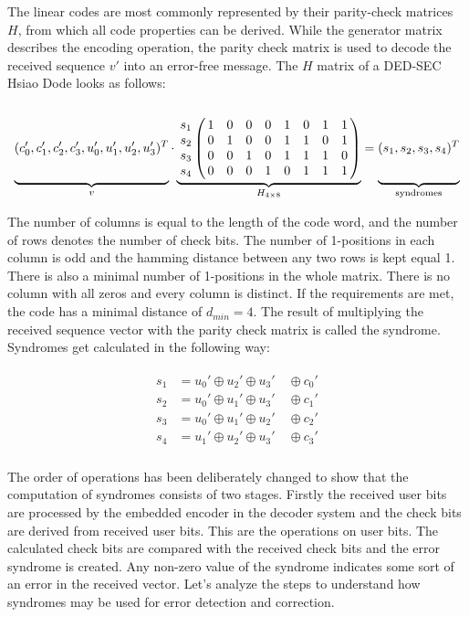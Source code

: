 The linear codes are most commonly represented by their parity-check matrices $H$, from which all code properties can be derived. While the generator matrix describes the encoding operation, the parity check matrix is used to decode the received sequence $v'$ into an error-free message. The $H$ matrix of a DED-SEC Hsiao Dode looks as follows:
\begin{equation*}
\underbrace{
\vphantom{\bordermatrix{&&&&&&&&\cr &1&0&0&0&1&1&1&0\cr&0&1&0&0&0&1&1&1\cr&0&0&1&0&1&0&1&1\cr&0&0&0&1&1&1&0&1\cr}
}(c_0',c_1',c_2',c_3',u_0',u_1',u_2',u_3')^T}_{v}
\cdot \underbrace{\bordermatrix{
&&&&&&&&\cr 
 s_1 &1& 0 & 0 & 0 &1&0&1&1 \cr 
 s_2 &0& 1 & 0 & 0 &1&1&0&1 \cr 
 s_3 &0& 0 & 1 & 0 &1&1&1&0\cr 
 s_4 &0& 0 & 0 & 1 &0&1&1&1
}}_{H_{4\times 8}} = 
\underbrace{
\vphantom{\bordermatrix{&&&&&&&&\cr &1&0&0&0&1&1&1&0\cr&0&1&0&0&0&1&1&1\cr&0&0&1&0&1&0&1&1\cr&0&0&0&1&1&1&0&1\cr}
}(s_1,s_2,s_3,s_4)^T}_{\text{syndromes}}
\end{equation*}

The number of columns is equal to the length of the code word, and the number of rows denotes the number of check bits. The number of 1-positions in each column is odd and the hamming distance between any two rows is kept equal 1. There is also a minimal number of 1-positions in the whole matrix. There is no column with all zeros and every column is distinct. If the requirements are met, the code has a minimal distance of $d_{min} = 4$. The result of multiplying the received sequence vector with the parity check matrix is called the syndrome. Syndromes get calculated in the following way:

\begin{align}
\begin{aligned}
s_1 &= u_0' \oplus u_2' \oplus u_3' \quad\oplus c_0' \\
s_2 &= u_0' \oplus u_1' \oplus u_3' \quad\oplus c_1' \\
s_3 &= u_0' \oplus u_1' \oplus u_2' \quad\oplus c_2' \\
s_4 &= u_1'\oplus u_2' \oplus u_3' \quad\oplus c_3' \\
\end{aligned}
\end{align}

The order of operations has been deliberately changed to show that the computation of syndromes consists of two stages. Firstly the received user bits are processed by the embedded encoder in the decoder system and the check bits are derived from received user bits. This are the operations on user bits. The calculated check bits are compared with the received check bits and the error syndrome is created. Any non-zero value of the syndrome indicates some sort of an error in the received vector. Let's analyze the steps to understand how syndromes may be used for error detection and correction. 

